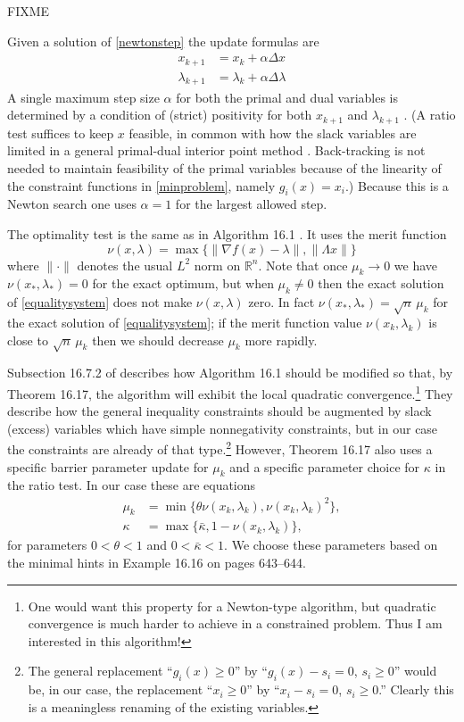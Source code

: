 \documentclass[11pt]{article}
\newcommand{\RR}{\mathbb{R}}
\newcommand{\grad}{\nabla}
\begin{document}
FIXME

Given a solution of \eqref{newtonstep} the update formulas are
\begin{align*}
x_{k+1} &= x_k + \alpha \Delta x \\
\lambda_{k+1} &= \lambda_k + \alpha \Delta \lambda
\end{align*}
A single maximum step size $\alpha$ for both the primal and dual variables is determined by a condition of (strict) positivity for both $x_{k+1}$ and $\lambda_{k+1}$ \cite{NocedalWright2006}.  (A ratio test suffices to keep $x$ feasible, in common with how the slack variables are limited in a general primal-dual interior point method \cite[subsection 16.7.2]{GrivaNashSofer2009}.  Back-tracking is not needed to maintain feasibility of the primal variables because of the linearity of the constraint functions in \eqref{minproblem}, namely $g_i(x)=x_i$.)  Because this is a Newton search one uses $\alpha=1$ for the largest allowed step.

The optimality test is the same as in Algorithm 16.1 \cite{GrivaNashSofer2009}.  It uses the merit function
\begin{equation}
    \nu(x,\lambda) = \max\{\|\grad f(x)-\lambda\|,\|\Lambda x\|\}  \label{merit}
\end{equation}
where $\|\cdot\|$ denotes the usual $L^2$ norm on $\RR^n$.  Note that once $\mu_k\to 0$ we have $\nu(x_*,\lambda_*) = 0$ for the exact optimum, but when $\mu_k \ne 0$ then the exact solution of \eqref{equalitysystem} does not make $\nu(x,\lambda)$ zero.  In fact $\nu(x_*,\lambda_*) = \sqrt{n}\, \mu_k$ for the exact solution of \eqref{equalitysystem}; if the merit function value $\nu(x_k,\lambda_k)$ is close to $\sqrt{n}\, \mu_k$ then we should decrease $\mu_k$ more rapidly.

Subsection 16.7.2 of \cite{GrivaNashSofer2009} describes how Algorithm 16.1 should be modified so that, by Theorem 16.17, the algorithm will exhibit the local quadratic convergence.\footnote{One would want this property for a Newton-type algorithm, but quadratic convergence is much harder to achieve in a constrained problem.  Thus I am interested in this algorithm!}  They describe how the general inequality constraints should be augmented by slack (excess) variables which have simple nonnegativity constraints, but in our case the constraints are already of that type.\footnote{The general replacement ``$g_i(x)\ge 0$'' by ``$g_i(x) - s_i =0$, $s_i\ge 0$'' would be, in our case, the replacement ``$x_i\ge 0$'' by ``$x_i-s_i=0$, $s_i\ge 0$.''  Clearly this is a meaningless renaming of the existing variables.}  However, Theorem 16.17 also uses a specific barrier parameter update for $\mu_k$ and a specific parameter choice for $\kappa$ in the ratio test.  In our case these are equations
\begin{align*}
\mu_k &= \min\{\theta \nu(x_k,\lambda_k),\nu(x_k,\lambda_k)^2\}, \\
\kappa &= \max\{\bar\kappa,1-\nu(x_k,\lambda_k)\},
\end{align*}
for parameters $0<\theta<1$ and $0<\bar\kappa<1$.  We choose these parameters based on the minimal hints in Example 16.16 on pages 643--644.
\end{document}
